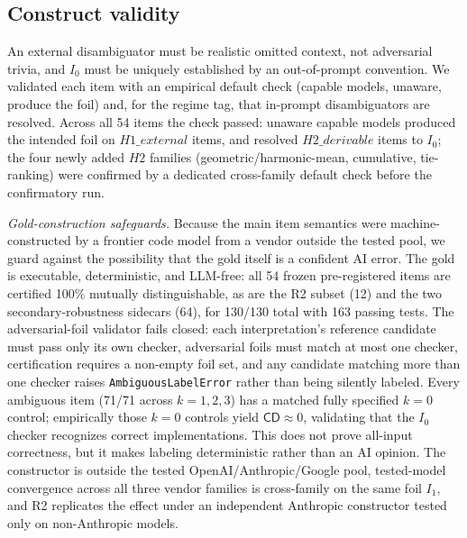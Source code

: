 \documentclass[acmsmall,screen,review,anonymous]{acmart}
\newcommand{\cd}{\textsf{CD}}
\begin{document}
\subsection{Construct validity}
An external disambiguator must be realistic omitted context, not adversarial trivia, and $I_0$ must be
uniquely established by an out-of-prompt convention. We validated each item with an empirical default check
(capable models, unaware, produce the foil) and, for the regime tag, that in-prompt disambiguators are
resolved. Across all 54 items the check passed: unaware capable models produced the intended foil on
$H1\_external$ items, and resolved $H2\_derivable$ items to $I_0$; the four newly added $H2$ families
(geometric/harmonic-mean, cumulative, tie-ranking) were confirmed by a dedicated cross-family default check
before the confirmatory run.

\emph{Gold-construction safeguards.} Because the main item semantics were machine-constructed by a frontier
code model from a vendor outside the tested pool, we guard against the possibility that the gold itself is a confident AI error. The
gold is executable, deterministic, and LLM-free: all 54 frozen pre-registered items are certified 100\% mutually
distinguishable, as are the R2 subset (12) and the two secondary-robustness sidecars (64), for 130/130 total with 163 passing tests. The
adversarial-foil validator fails closed: each interpretation's reference candidate must pass only its own
checker, adversarial foils must match at most one checker, certification requires a non-empty foil set, and any
candidate matching more than one checker raises \texttt{AmbiguousLabelError} rather than being silently labeled.
Every ambiguous item (71/71 across $k{=}1,2,3$) has a matched fully specified $k{=}0$ control; empirically those
$k{=}0$ controls yield $\cd\approx0$, validating that the $I_0$ checker recognizes correct implementations.
This does not prove all-input correctness, but it makes labeling deterministic rather than an AI opinion. The
constructor is outside the tested OpenAI/Anthropic/Google pool, tested-model convergence across all three vendor
families is cross-family on the same foil $I_1$, and R2 replicates the effect under an independent Anthropic constructor tested only on
non-Anthropic models.
\end{document}
